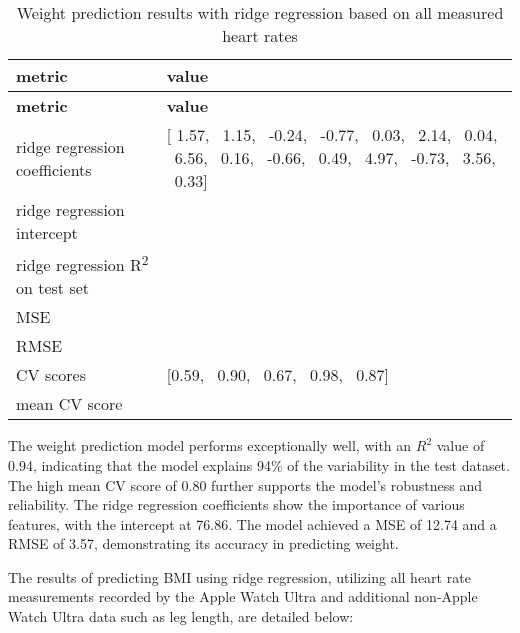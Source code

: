 \begin{table}[H]
\begin{longtable}{|>{\raggedright}p{4cm}|>{\raggedright\arraybackslash}p{10cm}|}
\hline
\textbf{metric} & \textbf{value} \\
\hline
\endfirsthead
\hline
\textbf{metric} & \textbf{value} \\
\hline
\endhead
\hline
\endfoot
ridge regression coefficients & 
\begin{minipage}[t]{10cm}
[ 1.57, \  1.15, \ -0.24, \ -0.77, \  0.03, \  2.14, \  0.04, \  6.56, \  0.16, \ -0.66, \  0.49, \  4.97, \ -0.73, \  3.56, \  0.33]
\end{minipage}
\\
\hline
ridge regression intercept & 76.86 \\
\hline
ridge regression R\textsuperscript{2} on test set & 0.94 \\
\hline
MSE & 12.74 \\
\hline
RMSE & 3.57 \\
\hline
CV scores & 
\begin{minipage}[t]{10cm}
[0.59, \ 0.90, \ 0.67, \ 0.98, \ 0.87]
\end{minipage}
\\
\hline
mean CV score & 0.80 \\
\hline
\end{longtable}
\caption{Weight prediction results with ridge regression based on all measured heart rates}
\label{tab:RRweightallheart}
\end{table}

The weight prediction model performs exceptionally well, with an \( R^2 \) value of 0.94, indicating that the model explains 94\% of the variability in the test dataset. The high mean CV score of 0.80 further supports the model's robustness and reliability. The ridge regression coefficients show the importance of various features, with the intercept at 76.86. The model achieved a MSE of 12.74 and a RMSE of 3.57, demonstrating its accuracy in predicting weight.

The results of predicting BMI using ridge regression, utilizing all heart rate measurements recorded by the Apple Watch Ultra and additional non-Apple Watch Ultra data such as leg length, are detailed below:

